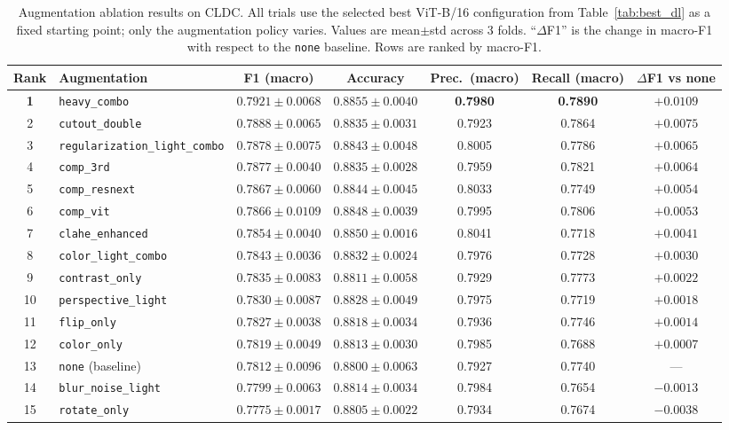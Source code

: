 \begin{table}[t]
\centering
\caption{Augmentation ablation results on CLDC. All trials use the selected best ViT-B/16 configuration from Table~\ref{tab:best_dl} as a fixed starting point; only the augmentation policy varies. Values are mean$\pm$std across 3 folds. ``$\Delta$F1'' is the change in macro-F1 with respect to the \texttt{none} baseline. Rows are ranked by macro-F1.}
\label{tab:results_aug}
\renewcommand{\arraystretch}{1.2}
\setlength{\tabcolsep}{4pt}
\begin{tabular}{clccccc}
\toprule
\textbf{Rank} & \textbf{Augmentation} & \textbf{F1 (macro)} & \textbf{Accuracy} & \textbf{Prec.\ (macro)} & \textbf{Recall (macro)} & \textbf{$\Delta$F1 vs none} \\
\midrule
\textbf{1} & \texttt{heavy\_combo} & \textbf{$0.7921 \pm 0.0068$} & \textbf{$0.8855 \pm 0.0040$} & \textbf{0.7980} & \textbf{0.7890} & \textbf{$+0.0109$} \\
2 & \texttt{cutout\_double} & $0.7888 \pm 0.0065$ & $0.8835 \pm 0.0031$ & 0.7923 & 0.7864 & $+0.0075$ \\
3 & \texttt{regularization\_light\_combo} & $0.7878 \pm 0.0075$ & $0.8843 \pm 0.0048$ & 0.8005 & 0.7786 & $+0.0065$ \\
4 & \texttt{comp\_3rd} & $0.7877 \pm 0.0040$ & $0.8835 \pm 0.0028$ & 0.7959 & 0.7821 & $+0.0064$ \\
5 & \texttt{comp\_resnext} & $0.7867 \pm 0.0060$ & $0.8844 \pm 0.0045$ & 0.8033 & 0.7749 & $+0.0054$ \\
6 & \texttt{comp\_vit} & $0.7866 \pm 0.0109$ & $0.8848 \pm 0.0039$ & 0.7995 & 0.7806 & $+0.0053$ \\
7 & \texttt{clahe\_enhanced} & $0.7854 \pm 0.0040$ & $0.8850 \pm 0.0016$ & 0.8041 & 0.7718 & $+0.0041$ \\
8 & \texttt{color\_light\_combo} & $0.7843 \pm 0.0036$ & $0.8832 \pm 0.0024$ & 0.7976 & 0.7728 & $+0.0030$ \\
9 & \texttt{contrast\_only} & $0.7835 \pm 0.0083$ & $0.8811 \pm 0.0058$ & 0.7929 & 0.7773 & $+0.0022$ \\
10 & \texttt{perspective\_light} & $0.7830 \pm 0.0087$ & $0.8828 \pm 0.0049$ & 0.7975 & 0.7719 & $+0.0018$ \\
11 & \texttt{flip\_only} & $0.7827 \pm 0.0038$ & $0.8818 \pm 0.0034$ & 0.7936 & 0.7746 & $+0.0014$ \\
12 & \texttt{color\_only} & $0.7819 \pm 0.0049$ & $0.8813 \pm 0.0030$ & 0.7985 & 0.7688 & $+0.0007$ \\
13 & \texttt{none} (baseline) & $0.7812 \pm 0.0096$ & $0.8800 \pm 0.0063$ & 0.7927 & 0.7740 & --- \\
14 & \texttt{blur\_noise\_light} & $0.7799 \pm 0.0063$ & $0.8814 \pm 0.0034$ & 0.7984 & 0.7654 & $-0.0013$ \\
15 & \texttt{rotate\_only} & $0.7775 \pm 0.0017$ & $0.8805 \pm 0.0022$ & 0.7934 & 0.7674 & $-0.0038$ \\
\bottomrule
\end{tabular}
\end{table}
